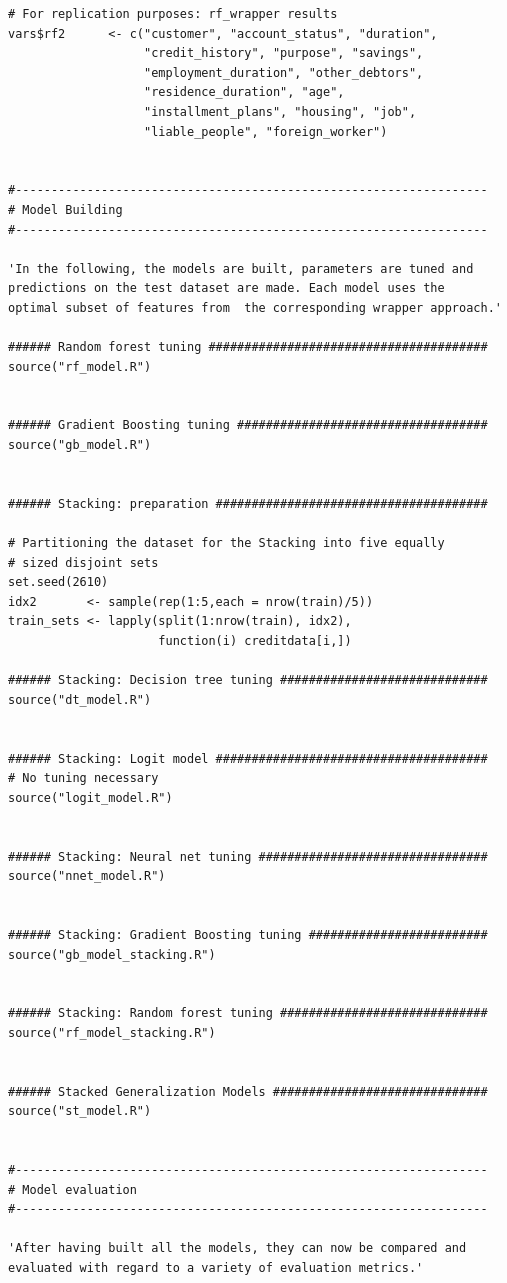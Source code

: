 \documentclass[12pt]{article}
\begin{document}
\begin{lstlisting}
# For replication purposes: rf_wrapper results
vars$rf2      <- c("customer", "account_status", "duration",
                   "credit_history", "purpose", "savings",
                   "employment_duration", "other_debtors",
                   "residence_duration", "age",
                   "installment_plans", "housing", "job",
                   "liable_people", "foreign_worker")


#------------------------------------------------------------------
# Model Building
#------------------------------------------------------------------

'In the following, the models are built, parameters are tuned and 
predictions on the test dataset are made. Each model uses the 
optimal subset of features from  the corresponding wrapper approach.'

###### Random forest tuning #######################################
source("rf_model.R")


###### Gradient Boosting tuning ###################################
source("gb_model.R")


###### Stacking: preparation ######################################

# Partitioning the dataset for the Stacking into five equally 
# sized disjoint sets
set.seed(2610)
idx2       <- sample(rep(1:5,each = nrow(train)/5)) 
train_sets <- lapply(split(1:nrow(train), idx2), 
                     function(i) creditdata[i,])

###### Stacking: Decision tree tuning #############################
source("dt_model.R")


###### Stacking: Logit model ######################################
# No tuning necessary 
source("logit_model.R")


###### Stacking: Neural net tuning ################################
source("nnet_model.R")


###### Stacking: Gradient Boosting tuning #########################
source("gb_model_stacking.R")


###### Stacking: Random forest tuning #############################
source("rf_model_stacking.R")


###### Stacked Generalization Models ##############################
source("st_model.R")


#------------------------------------------------------------------
# Model evaluation
#------------------------------------------------------------------

'After having built all the models, they can now be compared and 
evaluated with regard to a variety of evaluation metrics.'


\end{lstlisting}
\end{document}
